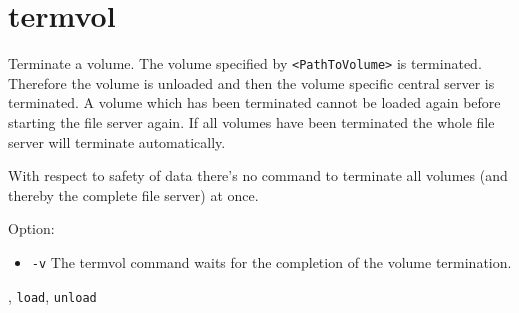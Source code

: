 \section{termvol}
\begin{man}
  \PP Terminate a volume.
  \DE The volume specified by {\tt <PathToVolume>} is terminated.
             Therefore the volume is unloaded and then the volume specific
             central server is terminated. A volume which has been terminated 
             cannot be loaded again before starting the file server again. If 
             all volumes have been terminated the whole file server will 
             terminate automatically.
             \begin{note}
               With respect to safety of data there's no command to terminate
               all volumes (and thereby the complete file server) at once.
             \end{note}

             Option:

             \begin{itemize}
             \item {\tt -v}\newline
               The termvol command waits for the completion of the volume
               termination.
             \end{itemize}

  , {\tt load}, {\tt unload}
\end{man}
